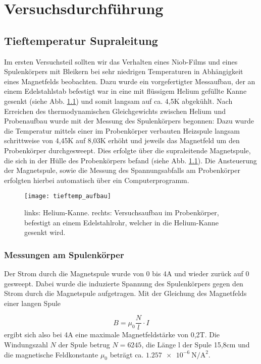 \chapter{Versuchsdurchführung}
\section{Tieftemperatur Supraleitung}
Im ersten Versuchsteil sollten wir das Verhalten eines Niob-Films und eines Spulenkörpers mit Bleikern bei sehr niedrigen Temperaturen in Abhängigkeit eines Magnetfelds beobachten. Dazu wurde ein vorgefertigter Messaufbau, der an einem Edelstahlstab befestigt war in eine mit flüssigem Helium gefüllte Kanne  gesenkt (siehe Abb. \ref{tieftemp_aufbau}) und somit langsam auf ca. 4,5K abgekühlt. Nach Erreichen des thermodynamischen Gleichgewichts zwischen Helium und Probenaufbau wurde mit der Messung des Spulenkörpers begonnen: Dazu wurde die Temperatur mittels einer im Probenkörper verbauten Heizspule langsam schrittweise von 4,45K auf 8,03K erhöht und jeweils das Magnetfeld um den Probenkörper durchgesweept. Dies erfolgte über die supraleitende Magnetspule, die sich in der Hülle des Probenkörpers befand (siehe Abb. \ref{tieftemp_aufbau}). Die Ansteuerung der Magnetspule, sowie die Messung des Spannungsabfalls am Probenkörper erfolgten hierbei automatisch über ein Computerprogramm. 


\begin{figure}[H]
	\begin{center}
		\texttt{[image: tieftemp\_aufbau]}
		\caption{links: Helium-Kanne. rechts: Versuchsaufbau im Probenkörper, befestigt an einem Edelstahlrohr, welcher in die Helium-Kanne gesenkt wird.}
		\label{tieftemp_aufbau}
	\end{center}
\end{figure}

\subsection{Messungen am Spulenkörper}
Der Strom durch die Magnetspule wurde von 0 bis 4A und wieder zurück auf 0 gesweept. Dabei wurde die induzierte Spannung des Spulenkörpers gegen den Strom durch die Magnetspule aufgetragen. Mit der Gleichung des Magnetfelds einer langen Spule

\[B=\mu_{0}\dfrac{N}{l}\cdot I\]
ergibt sich also bei 4A eine maximale Magnetfeldstärke von 0,2T. Die Windungszahl $N$ der Spule betrug $N=6245$, die Länge l der Spule 15,8cm und die magnetische Feldkonstante $\mu_{0}$ beträgt ca. $\SI{1,257e-6}{\newton\per\square\ampere}$.

